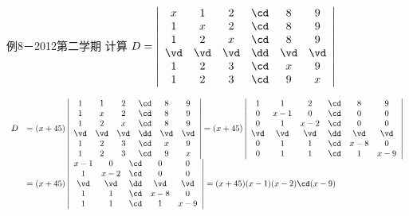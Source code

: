 \begin{frame}
  \begin{footnotesize}
    \begin{exampleblock}{例8－2012第二学期}
      计算
      $
      D=\left|
      \begin{array}{cccccc}
        x&1&2&\cd&8&9\\
        1&x&2&\cd&8&9\\
        1&2&x&\cd&8&9\\
        \vd&\vd&\vd&\dd&\vd&\vd\\
        1&2&3&\cd&x&9\\
        1&2&3&\cd&9&x
      \end{array}
      \right|
      $
    \end{exampleblock}
    \end{footnotesize}
  \begin{tiny}
    \pause\jiename
    $$
    \begin{array}{rl}
      D&=(x+45)\left|
    \begin{array}{cccccc}
      1&1&2&\cd&8&9\\
      1&x&2&\cd&8&9\\
      1&2&x&\cd&8&9\\
      \vd&\vd&\vd&\dd&\vd&\vd\\
      1&2&3&\cd&x&9\\
      1&2&3&\cd&9&x
      \end{array}
    \right|=(x+45)\left|
    \begin{array}{cccccc}
      1&1&2&\cd&8&9\\
      0&x-1&0&\cd&0&0\\
      0&1&x-2&\cd&0&0\\
      \vd&\vd&\vd&\dd&\vd&\vd\\
      0&1&1&\cd&x-8&0\\
      0&1&1&\cd&1&x-9
      \end{array}
    \right|\\[0.4in]
    &=(x+45)\left|
    \begin{array}{cccccc}      
      x-1&0&\cd&0&0\\
      1&x-2&\cd&0&0\\
      \vd&\vd&\dd&\vd&\vd\\
      1&1&\cd&x-8&0\\
      1&1&\cd&1&x-9
      \end{array}
    \right|=(x+45)(x-1)(x-2)\cd(x-9)
    \end{array}
    $$
  \end{tiny}
\end{frame}

